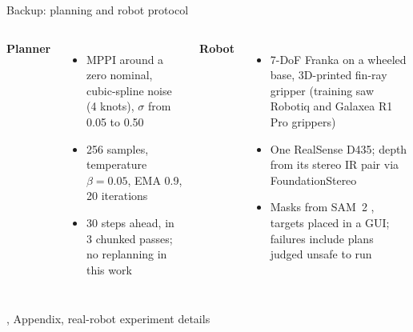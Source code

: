 \documentclass[aspectratio=169,12pt]{beamer}
\newcommand{\src}[1]{{\scriptsize\color{mute}\citep{#1}}}
\newcommand{\credit}[1]{\par\hfill{\tiny\color{mute}\citet{huang2026pointworld}, #1}\par}
\begin{document}
\begin{frame}{Backup: planning and robot protocol}
  \footnotesize
  \begin{columns}[t]
      {\small\bfseries Planner}
      \begin{itemize}\setlength{\itemsep}{2pt}
        \item MPPI around a zero nominal, cubic-spline noise (4 knots), $\sigma$ from 0.05
          to 0.50
        \item 256 samples, temperature $\beta = 0.05$, EMA 0.9, 20 iterations
        \item 30 steps ahead, in 3 chunked passes; no replanning in this work
      \end{itemize}
      {\small\bfseries Robot}
      \begin{itemize}\setlength{\itemsep}{2pt}
        \item 7-DoF Franka on a wheeled base, 3D-printed fin-ray gripper (training saw
          Robotiq and Galaxea R1 Pro grippers)
        \item One RealSense D435; depth from its stereo IR pair via FoundationStereo
        \item Masks from SAM~2 \src{ravi2024sam2}, targets placed in a GUI; failures include
          plans judged unsafe to run
      \end{itemize}
  \end{columns}
  \vspace{4pt}\credit{Appendix, real-robot experiment details}
\end{frame}
\end{document}
